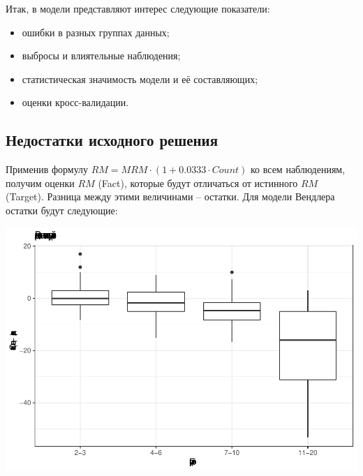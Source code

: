 \documentclass[
]{article}
\begin{document}
Итак, в модели представляют интерес следующие показатели:

\begin{itemize}
\item
  ошибки в разных группах данных;
\item
  выбросы и влиятельные наблюдения;
\item
  статистическая значимость модели и её составляющих;
\item
  оценки кросс-валидации.
\end{itemize}

\hypertarget{ux43dux435ux434ux43eux441ux442ux430ux442ux43aux438-ux438ux441ux445ux43eux434ux43dux43eux433ux43e-ux440ux435ux448ux435ux43dux438ux44f}{%
\subsection{Недостатки исходного
решения}\label{ux43dux435ux434ux43eux441ux442ux430ux442ux43aux438-ux438ux441ux445ux43eux434ux43dux43eux433ux43e-ux440ux435ux448ux435ux43dux438ux44f}}

Применив формулу \(RM=MRM \cdot(1+0.0333 \cdot Count)\) ко всем
наблюдениям, получим оценки \(RM\) (Fact), которые будут отличаться от
истинного \(RM\) (Target). Разница между этими величинами -- остатки.
Для модели Вендлера остатки будут следующие:

\begin{center}\includegraphics{Regression-model-for-estimating-RM_files/figure-latex/unnamed-chunk-28-1} \end{center}
\end{document}
